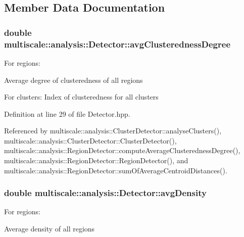 \subsection{Member Data Documentation}
\hypertarget{classmultiscale_1_1analysis_1_1Detector_a6d06607ae468a56e48f8daba0a00df5b}{
\subsubsection[{avg\-Clusteredness\-Degree}]{\setlength{\rightskip}{0pt plus 5cm}double multiscale\-::analysis\-::\-Detector\-::avg\-Clusteredness\-Degree\hspace{0.3cm}{\ttfamily [protected]}}}\label{classmultiscale_1_1analysis_1_1Detector_a6d06607ae468a56e48f8daba0a00df5b}
\begin{DoxyVerb}      For regions:
\end{DoxyVerb}
 Average degree of clusteredness of all regions

For clusters\-: Index of clusteredness for all clusters 

Definition at line 29 of file Detector.\-hpp.



Referenced by multiscale\-::analysis\-::\-Cluster\-Detector\-::analyse\-Clusters(), multiscale\-::analysis\-::\-Cluster\-Detector\-::\-Cluster\-Detector(), multiscale\-::analysis\-::\-Region\-Detector\-::compute\-Average\-Clusteredness\-Degree(), multiscale\-::analysis\-::\-Region\-Detector\-::\-Region\-Detector(), and multiscale\-::analysis\-::\-Region\-Detector\-::sum\-Of\-Average\-Centroid\-Distances().

\hypertarget{classmultiscale_1_1analysis_1_1Detector_a411629d4cf34809127662d625ba057c0}{
\subsubsection[{avg\-Density}]{\setlength{\rightskip}{0pt plus 5cm}double multiscale\-::analysis\-::\-Detector\-::avg\-Density\hspace{0.3cm}{\ttfamily [protected]}}}\label{classmultiscale_1_1analysis_1_1Detector_a411629d4cf34809127662d625ba057c0}
\begin{DoxyVerb}                  For regions:
\end{DoxyVerb}
 Average density of all regions

